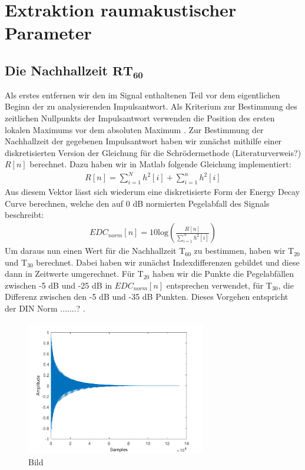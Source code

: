 \chapter{Extraktion raumakustischer Parameter}
\section{Die Nachhallzeit $\mathbf{RT_{60}}$}
\label{sec:rt60}
Als erstes entfernen wir den im Signal enthaltenen Teil vor dem eigentlichen Beginn der zu analysierenden Impulsantwort.
Als Kriterium zur Bestimmung des zeitlichen Nullpunkts der Impulsantwort verwenden die Position des ersten lokalen Maximums vor dem absoluten Maximum .
Zur Bestimmung der Nachhallzeit der gegebenen Impulsantwort haben wir zunächst mithilfe einer diskretisierten Version der Gleichung für die Schrödermethode (Literaturverweis?) $R[n]$ berechnet.
Dazu haben wir in Matlab folgende Gleichung implementiert:
\begin{align*}
R[n] = \sum_{i=1}^N h^2[i] + \sum_{i=1}^n h^2[i]
\end{align*}
Aus diesem Vektor lässt sich wiederum eine diskretisierte Form der Energy Decay Curve berechnen, welche den auf 0 dB normierten Pegelabfall des Signals  beschreibt:
\begin{align*}
EDC_{norm}[n] = 10 \mathrm{log} \left(\frac{R[n]}{\sum_{i=1}^N h^2[i]}\right)
\end{align*}
Um daraus nun einen Wert für die Nachhallzeit T$_60$ zu bestimmen, haben wir T$_{20}$ und T$_{30}$ berechnet.
Dabei haben wir zunächst Indexdifferenzen gebildet und diese dann in Zeitwerte umgerechnet.
Für T$_{20}$ haben wir die Punkte die Pegelabfällen zwischen -5 dB und -25 dB in $EDC_{norm}[n]$ entsprechen verwendet, für T$_{30}$, die Differenz zwischen den -5 dB und -35 dB Punkten.
Dieses Vorgehen entspricht der DIN Norm .......? .
  




\begin{figure}[H]
    \center
    \includegraphics[width = 0.7\textwidth]{figures/samples.pdf}
    \caption{Bild}
    \label{fig:bs1}
\end{figure}


